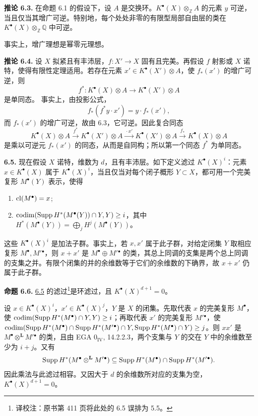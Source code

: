 \textbf{推论 6.3.} 在命题 6.1 的假设下，设 \(A\) 是交换环。\(K^\bullet(X)\otimes_{\mathbb Z}A\) 的元素 \(y\) 可逆，当且仅当其增广可逆。特别地，每个处处非零的有限型局部自由层的类在 \(K^\bullet(X)\otimes_{\mathbb Z}\mathbb Q\) 中可逆。

事实上，增广理想是幂零元理想。

\textbf{推论 6.4.} 设 \(X\) 拟紧且有丰沛层，\(f:X'\to X\) 固有且完美。再假设 \(f\) 射影或 \(X\) 诺特，使得有限性定理适用。若存在元素 \(x'\in K^\bullet(X')\otimes A\)，使 \(f_*(x')\) 的增广可逆，则
\[
  f^*:K^\bullet(X)\otimes A\longrightarrow K^\bullet(X')\otimes A
\]
是单同态。
事实上，由投影公式，
\[
  f_*(f^*y\cdot x')=y\cdot f_*(x'),
\]
而 \(f_*(x')\) 的增广可逆，故由 6.3，它可逆。因此复合同态\[K^\bullet(X)\otimes A\xrightarrow{f^*}K^\bullet(X')\otimes A\xrightarrow{\,\cdot x'\,}K^\bullet(X')\otimes A\xrightarrow{f_*}K^\bullet(X)\otimes A\]是乘以可逆元 \(f_*(x')\) 的同态，从而是自同构；所以第一个同态 \(f^*\) 为单同态。

\noindent\textbf{6.5.}
现在假设 \(X\) 诺特，维数为 \(d\)，且有丰沛层。如下定义滤过 \(K^\bullet(X)^i\)：元素 \(x\in K^\bullet(X)\) 属于 \(K^\bullet(X)^i\)，当且仅当对每个闭子概形 \(Y\subset X\)，都可用一个完美复形 \(M^\bullet(Y)\) 表示，使得
\begin{enumerate}[label=\textup{\alph*)}]
\item \(\operatorname{cl}(M^\bullet)=x\);
\item \(\operatorname{codim}(\operatorname{Supp} H^*(M^\bullet(Y))\cap Y,Y)\geq i\)，其中 \(H^*(M^\bullet(Y))=\bigoplus_jH^j(M^\bullet(Y))\)。
\end{enumerate}
这些 \(K^\bullet(X)^i\) 是加法子群。事实上，若 \(x,x'\) 属于此子群，对给定闭集 \(Y\) 取相应复形 \(M^\bullet,M'{}^\bullet\)，则 \(x+x'\) 是 \(M^\bullet\oplus M'{}^\bullet\) 的类，其总上同调的支集是两个总上同调的支集之并。有限个闭集的并的余维数等于它们的余维数的下确界，故 \(x+x'\) 仍属于此子群。

\textbf{命题 6.6.} \hyperlink{sga6.e06.sec.6.5}{6.5} 的滤过\footnote{译校注：原书第 411 页将此处的 6.5 误排为 5.5。}是环滤过，且 \(K^\bullet(X)^{d+1}=0\)。

设 \(x\in K^\bullet(X)^i\)，\(x'\in K^\bullet(X)^j\)，\(Y\) 是 \(X\) 的闭集。先取代表 \(x\) 的完美复形 \(M^\bullet\)，使 \(\operatorname{codim}(\operatorname{Supp} H^*(M^\bullet)\cap Y,Y)\geq i\)；再取代表 \(x'\) 的完美复形 \(M'{}^\bullet\)，使 \(\operatorname{codim}(\operatorname{Supp} H^*(M^\bullet)\cap\operatorname{Supp} H^*(M'{}^\bullet)\cap Y,\operatorname{Supp} H^*(M^\bullet)\cap Y)\geq j\)。则 \(xx'\) 是 \(M^\bullet\otimes^{\mathbf L}M'{}^\bullet\) 的类，且由 EGA \(0_{\mathrm{IV}}\), 14.2.2.3，两个支集与 \(Y\) 的交在 \(Y\) 中的余维数至少为 \(i+j\)。又有
\[
 \operatorname{Supp} H^*(M^\bullet\otimes^{\mathbf L}M'{}^\bullet)\subseteq\operatorname{Supp} H^*(M^\bullet)\cap\operatorname{Supp} H^*(M'{}^\bullet).
\]
因此乘法与此滤过相容。又因大于 \(d\) 的余维数所对应的支集为空，\(K^\bullet(X)^{d+1}=0\)。

